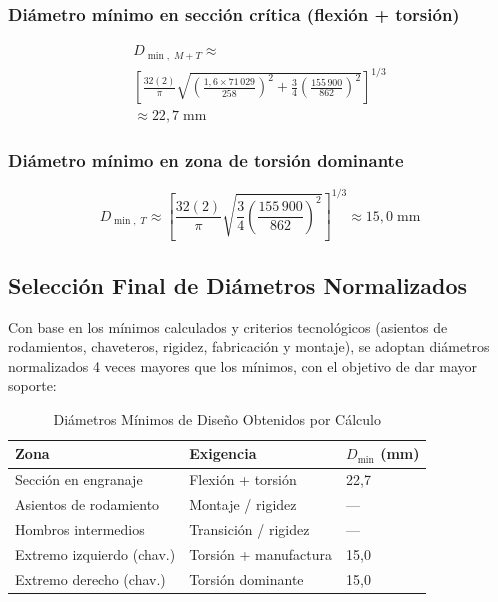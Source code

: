 \documentclass[conference]{IEEEtran}
\begin{document}
\subsubsection{Diámetro mínimo en sección crítica (flexión + torsión)}
\begin{multline}
D_{\min,\;M+T} \approx \\
\left[\frac{32(2)}{\pi}\sqrt{\left(\frac{1{,}6\times 71\,029}{258}\right)^2
+\frac{3}{4}\left(\frac{155\,900}{862}\right)^2}\right]^{1/3} \\
\approx 22{,}7\;\mathrm{mm}
\end{multline}

\subsubsection{Diámetro mínimo en zona de torsión dominante}
\begin{equation}
D_{\min,\;T}\approx
\left[\frac{32(2)}{\pi}\sqrt{\frac{3}{4}
\left(\frac{155\,900}{862}\right)^2}\right]^{1/3}
\approx 15{,}0\;\mathrm{mm}
\end{equation}

\subsection{Selección Final de Diámetros Normalizados}

Con base en los mínimos calculados y criterios tecnológicos (asientos de rodamientos,
chaveteros, rigidez, fabricación y montaje), se adoptan diámetros normalizados 4 veces
mayores que los mínimos, con el objetivo de dar mayor soporte:

\begin{table}[H]
\centering
\caption{Diámetros Mínimos de Diseño Obtenidos por Cálculo}
\label{tab:diametros}
\begin{tabular}{lll}
\hline
\textbf{Zona} & \textbf{Exigencia} & $D_{\min}$ \textbf{(mm)} \\
\hline
Sección en engranaje      & Flexión + torsión     & 22{,}7 \\
Asientos de rodamiento    & Montaje / rigidez     & ---    \\
Hombros intermedios       & Transición / rigidez  & ---    \\
Extremo izquierdo (chav.) & Torsión + manufactura & 15{,}0 \\
Extremo derecho (chav.)   & Torsión dominante     & 15{,}0 \\
\hline
\end{tabular}
\end{table}
\end{document}
